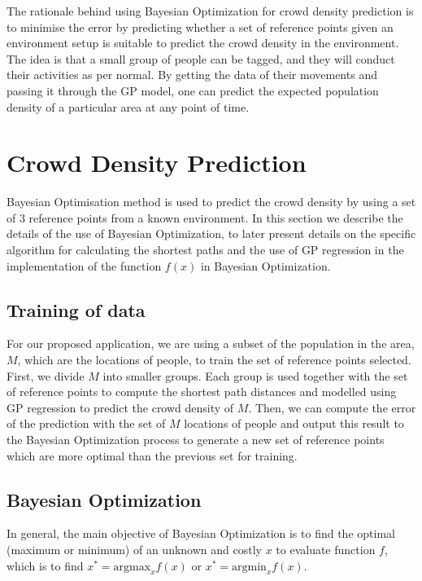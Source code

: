 \documentclass[letterpaper]{article}
\begin{document}
The rationale behind using Bayesian Optimization for crowd density prediction is to minimise the error by predicting whether a set of reference points given an environment setup is suitable to predict the crowd density in the environment. The idea is that a small group of people can be tagged, and they will conduct their activities as per normal. By getting the data of their movements and passing it through the GP model, one can predict the expected population density of a particular area at any point of time.

\section{Crowd Density Prediction}

Bayesian Optimisation method is used to predict the crowd density by using a set of $3$ reference points from a known environment. In this section we describe the details of the use of Bayesian Optimization, to later present details on the specific algorithm for calculating the shortest paths and the use of GP regression in the implementation of the function $f(x)$ in Bayesian Optimization.

\subsection{Training of data}

For our proposed application, we are using a subset of the population in the area, $M$, which are the locations of people, to train the set of reference points selected. First, we divide $M$ into smaller groups. Each group is used together with the set of reference points to compute the shortest path distances and modelled using GP regression to predict the crowd density of $M$. Then, we can compute the error of the prediction with the set of $M$ locations of people and output this result to the Bayesian Optimization process to generate a new set of reference points which are more optimal than the previous set for training.

\subsection{Bayesian Optimization}

In general, the main objective of Bayesian Optimization is to find the optimal (maximum or minimum) of an unknown and costly $x$ to evaluate function $f$, which is to find $x^* = \text{argmax}_x f(x)$ or $x^* = \text{argmin}_x f(x)$. \\
\end{document}
